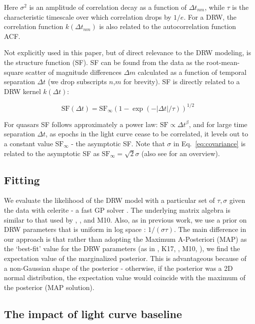 \documentclass[twocolumn]{aastex62}
\newcommand{\project}[1]{\textsf{#1}}
\begin{document}
Here $\sigma^{2}$ is an amplitude of correlation decay as a function of $\Delta t_{nm}$,  while $\tau$ is the characteristic timescale over which correlation drops by $1/e$. For a DRW,  the correlation function $k(\Delta t_{nm})$ is also related to the autocorrelation function ACF. 

Not explicitly used in this paper, but of direct relevance to the DRW modeling, is the structure function (SF). SF can be found from the data as the root-mean-square scatter of  magnitude differences $\Delta m$  calculated as a function of temporal separation $\Delta t$ (we drop subscripts $n$,$m$ for brevity). SF is directly related to a DRW kernel $k(\Delta t)$:

\begin{equation}
\mathrm{SF}(\Delta t) = \mathrm{SF}_{\infty} (1-\exp{(-|\Delta t|/\tau)})^{1/2}
\end{equation}

For quasars SF follows approximately a power law: $\mathrm{SF} \propto \Delta t^{\beta}$,  and for large time separation $\Delta t$, as epochs in the light curve cease to be correlated, it levels out to a constant value $\mathrm{SF}_{\infty}$ - the asymptotic SF.  Note that $\sigma$ in Eq.~\ref{eq:covariance} is related to the asymptotic SF as $\mathrm{SF}_\infty = \sqrt{2} \sigma$ (also see \citet{macleod2012, bauer2009, graham2015a} for an overview).


\subsection{Fitting}
We evaluate the likelihood of the DRW model with a particular set of $\tau,\sigma$ given the data with \project{celerite}  - a fast GP solver \citep{foreman2017}. The underlying matrix algebra is similar to that used by \cite{rybicki1992}, \cite{kozlowski2010}, and M10. Also, as in previous work, we use a prior on DRW parameters that is  uniform  in log space :  $1 / (\sigma \tau)$. The main difference in our approach is that rather than adopting the Maximum A-Posteriori (MAP) as the `best-fit' value for the DRW parameters (as in \citealt{kozlowski2010}, K17, \citealt{kozlowski2016b}, M10, \citealt{macleod2011}),  we find the expectation value of the marginalized posterior. This is advantageous because of a non-Gaussian shape of the posterior - otherwise, if the posterior was a 2D normal distribution, the expectation value would coincide with the maximum of the posterior (MAP solution). 

\subsection{The impact of light curve baseline}\label{sec:baseline}
\end{document}
